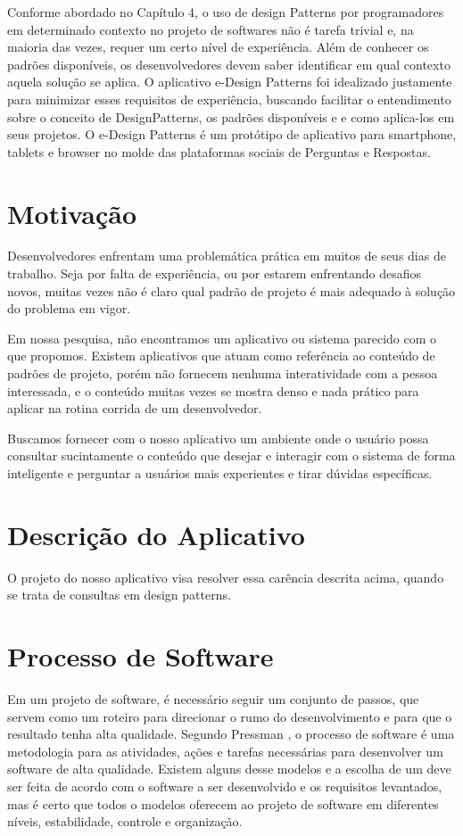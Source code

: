 Conforme abordado no Capítulo 4, o uso de design Patterns por programadores em determinado contexto no projeto de softwares não é tarefa trivial e, na maioria das vezes, requer um certo nível de experiência. Além de conhecer os padrões disponíveis, os desenvolvedores devem saber identificar em qual contexto aquela solução se aplica. O aplicativo e-Design Patterns foi idealizado justamente para minimizar esses requisitos de experiência, buscando facilitar o entendimento sobre o conceito de DesignPatterns, os padrões disponíveis e e como aplica-los em seus projetos. O e-Design Patterns é um protótipo de aplicativo para smartphone, tablets e browser no molde das plataformas sociais de Perguntas e Respostas.

\section{ Motivação}
Desenvolvedores enfrentam uma problemática prática em muitos de seus dias de trabalho. Seja por falta de experiência, ou por estarem enfrentando desafios novos, muitas vezes não é claro qual padrão de projeto é mais adequado à solução do problema em vigor.

Em nossa pesquisa, não encontramos um aplicativo ou sistema parecido com o que propomos. Existem aplicativos que atuam como referência ao conteúdo de padrões de projeto, porém não fornecem nenhuma interatividade com a pessoa interessada, e o conteúdo muitas vezes se mostra denso e nada prático para aplicar na rotina corrida de um desenvolvedor.

Buscamos fornecer com o nosso aplicativo um ambiente onde o usuário possa consultar sucintamente o conteúdo que desejar e interagir com o sistema de forma inteligente e perguntar a usuários mais experientes e tirar dúvidas específicas.

\section{Descrição do Aplicativo}
O projeto do nosso aplicativo visa resolver essa carência descrita acima, quando se trata de consultas em design patterns. 

\section{Processo de Software}

Em um projeto de software, é necessário seguir um conjunto de passos, que servem como um roteiro para direcionar o rumo do desenvolvimento e para que o resultado tenha alta qualidade. Segundo Pressman \cite{pressman2016engenharia}, o processo de software é uma metodologia para as atividades, ações e tarefas necessárias para desenvolver um software de alta qualidade. Existem alguns desse modelos e a escolha de um deve ser feita de acordo com o software a ser desenvolvido e os requisitos levantados, mas é certo que todos o modelos oferecem ao projeto de software em diferentes níveis, estabilidade, controle e organização.

